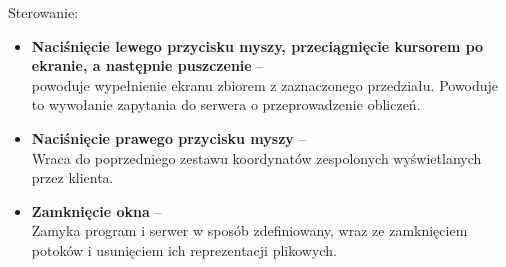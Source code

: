 Sterowanie:
\begin{itemize}
    \item \textbf{Naciśnięcie lewego przycisku myszy, przeciągnięcie kursorem po
    ekranie, a następnie puszczenie} -- \\
    powoduje wypełnienie ekranu zbiorem z zaznaczonego przedziału. Powoduje to
    wywołanie zapytania do serwera o przeprowadzenie obliczeń.
    \item \textbf{Naciśnięcie prawego przycisku myszy} -- \\
    Wraca do poprzedniego zestawu koordynatów zespolonych wyświetlanych przez klienta.
    \item \textbf{Zamknięcie okna} -- \\
    Zamyka program i serwer w sposób zdefiniowany, wraz ze zamknięciem potoków i
    usunięciem ich reprezentacji plikowych.
\end{itemize}